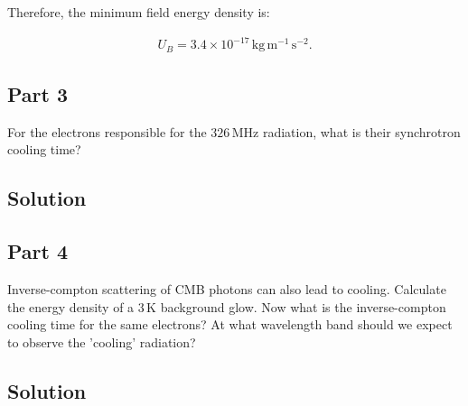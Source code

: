 \documentclass[12pt]{article}
\begin{document}
{\noindent}Therefore, the minimum field energy density is:

\begin{align*}
    \boxed{U_B = 3.4 \times 10^{-17} \,\mathrm{kg\,m^{-1}\,s^{-2}}}.
\end{align*}



\subsection*{Part 3}

For the electrons responsible for the $326\,\mathrm{MHz}$ radiation, what is their synchrotron cooling time?


\subsection*{Solution}




\subsection*{Part 4}

Inverse-compton scattering of CMB photons can also lead to cooling. Calculate the energy density of a $3\,\mathrm{K}$ background glow. Now what is the inverse-compton cooling time for the same electrons? At what wavelength band should we expect to observe the 'cooling' radiation?


\subsection*{Solution}
\end{document}
